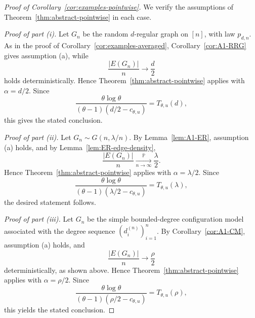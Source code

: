 \documentclass[11pt]{article}
\theoremstyle{remark}
\theoremstyle{plain}
\newcommand{\Pbb}{\mathbb{P}}
\newcommand{\1}{\mathbbm{1}}
\begin{document}
\begin{proof}[Proof of Corollary~\ref{cor:examples-pointwise}]
We verify the assumptions of Theorem~\ref{thm:abstract-pointwise} in each case.

\smallskip
\noindent\textit{Proof of part \textnormal{(i)}.}
Let \(G_n\) be the random \(d\)-regular graph on \([n]\), with law \(p_{d,n}\). As in the proof of
Corollary~\ref{cor:examples-averaged}, Corollary~\ref{cor:A1-RRG} gives assumption \textnormal{(a)},
while
\[
\frac{|E(G_n)|}{n}\to \frac d2
\]
holds deterministically. Hence Theorem~\ref{thm:abstract-pointwise} applies with \(\alpha=d/2\).
Since
\[
\frac{\theta\log\theta}{(\theta-1)(d/2-c_{\theta,u})}
=
T_{\theta,u}(d),
\]
this gives the stated conclusion.

\smallskip
\noindent\textit{Proof of part \textnormal{(ii)}.}
Let \(G_n\sim G(n,\lambda/n)\). By Lemma~\ref{lem:A1-ER}, assumption \textnormal{(a)} holds, and
by Lemma~\ref{lem:ER-edge-density},
\[
\frac{|E(G_n)|}{n}\xrightarrow[n\to\infty]{\Pbb}\frac{\lambda}{2}.
\]
Hence Theorem~\ref{thm:abstract-pointwise} applies with \(\alpha=\lambda/2\). Since
\[
\frac{\theta\log\theta}{(\theta-1)(\lambda/2-c_{\theta,u})}
=
T_{\theta,u}(\lambda),
\]
the desired statement follows.

\smallskip
\noindent\textit{Proof of part \textnormal{(iii)}.}
Let \(G_n\) be the simple bounded-degree configuration model associated with the degree sequence
\((d_i^{(n)})_{i=1}^n\). By Corollary~\ref{cor:A1-CM}, assumption \textnormal{(a)} holds, and
\[
\frac{|E(G_n)|}{n}\to \frac{\rho}{2}
\]
deterministically, as shown above. Hence Theorem~\ref{thm:abstract-pointwise} applies with
\(\alpha=\rho/2\). Since
\[
\frac{\theta\log\theta}{(\theta-1)(\rho/2-c_{\theta,u})}
=
T_{\theta,u}(\rho),
\]
this yields the stated conclusion.
\end{proof}
\end{document}
